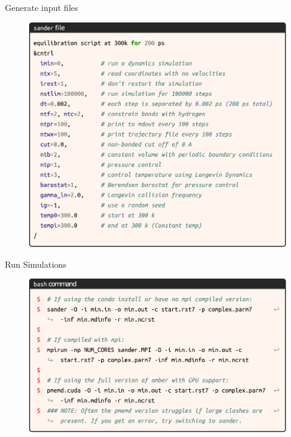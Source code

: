 \begin{frame}{Generate input files}
\begin{figure}
\includegraphics[height=0.8\textheight]{figures/dynamics/equil.pdf}
\end{figure}
\end{frame}

\begin{frame}{Run Simulations}
\begin{figure}
\includegraphics[height=0.7\textheight]{figures/dynamics/run.pdf}
\end{figure}
\end{frame}